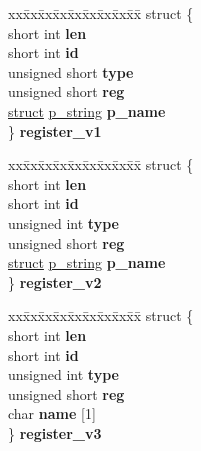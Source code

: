 \begin{DoxyCompactItemize}
\begin{tabbing}
\end{tabbing}\item 
\mbox{\label{unioncodeview__symbol_ad4625dffa683fcb172cac0343ff5bb66}} 
\begin{tabbing}
xx\=xx\=xx\=xx\=xx\=xx\=xx\=xx\=xx\=\kill
struct \{\\
\>short int {\bfseries len}\\
\>short int {\bfseries id}\\
\>unsigned short {\bfseries type}\\
\>unsigned short {\bfseries reg}\\
\>\hyperlink{interfacestruct}{struct} \hyperlink{structp__string}{p\_string} {\bfseries p\_name}\\
\} {\bfseries register\_v1}\\

\end{tabbing}\item 
\mbox{\label{unioncodeview__symbol_ae9bb97f11cde341bb6bb71345e99a147}} 
\begin{tabbing}
xx\=xx\=xx\=xx\=xx\=xx\=xx\=xx\=xx\=\kill
struct \{\\
\>short int {\bfseries len}\\
\>short int {\bfseries id}\\
\>unsigned int {\bfseries type}\\
\>unsigned short {\bfseries reg}\\
\>\hyperlink{interfacestruct}{struct} \hyperlink{structp__string}{p\_string} {\bfseries p\_name}\\
\} {\bfseries register\_v2}\\

\end{tabbing}\item 
\mbox{\label{unioncodeview__symbol_a86c6db5141cc0436e7242cc693e85bbb}} 
\begin{tabbing}
xx\=xx\=xx\=xx\=xx\=xx\=xx\=xx\=xx\=\kill
struct \{\\
\>short int {\bfseries len}\\
\>short int {\bfseries id}\\
\>unsigned int {\bfseries type}\\
\>unsigned short {\bfseries reg}\\
\>char {\bfseries name} \mbox{[}1\mbox{]}\\
\} {\bfseries register\_v3}\\


\end{tabbing}
\end{DoxyCompactItemize}

